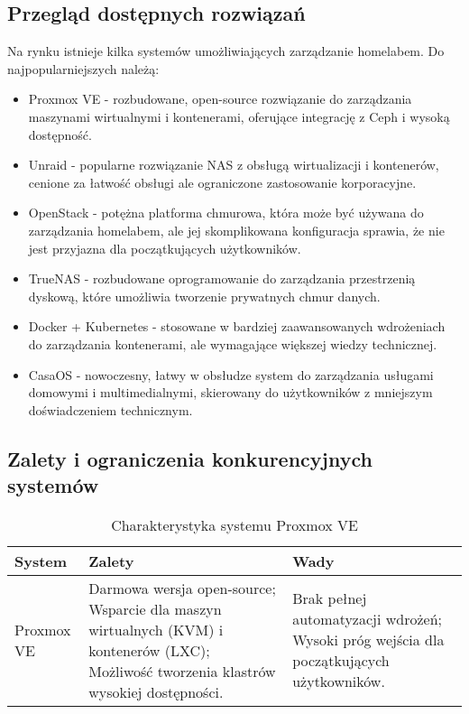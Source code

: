 \subsection{Przegląd dostępnych rozwiązań}
Na rynku istnieje kilka systemów umożliwiających zarządzanie homelabem. Do najpopularniejszych należą:
\begin{itemize}
    \item Proxmox VE \cite{Proxmox} - rozbudowane, open-source rozwiązanie do zarządzania maszynami wirtualnymi i kontenerami, oferujące integrację z Ceph i wysoką dostępność.
    \item Unraid \cite{Unraid} - popularne rozwiązanie NAS z obsługą wirtualizacji i kontenerów, cenione za łatwość obsługi ale ograniczone zastosowanie korporacyjne.
    \item OpenStack \cite{OpenStack} - potężna platforma chmurowa, która może być używana do zarządzania homelabem, ale jej skomplikowana konfiguracja sprawia, że nie jest przyjazna dla początkujących użytkowników.
    \item TrueNAS \cite{TrueNAS} - rozbudowane oprogramowanie do zarządzania przestrzenią dyskową, które umożliwia tworzenie prywatnych chmur danych.
    \item Docker \cite{Docker} + Kubernetes \cite{Kubernetes} - stosowane w bardziej zaawansowanych wdrożeniach do zarządzania kontenerami, ale wymagające większej wiedzy technicznej.
    \item CasaOS \cite{CasaOS} - nowoczesny, łatwy w obsłudze system do zarządzania usługami domowymi i multimedialnymi, skierowany do użytkowników z mniejszym doświadczeniem technicznym.
\end{itemize}


\subsection{Zalety i ograniczenia konkurencyjnych systemów}

\begin{table}[H]
\centering
\begin{tabular}{|p{3cm}|p{6cm}|p{6cm}|}
\hline
\textbf{System} & \textbf{Zalety} & \textbf{Wady} \\
\hline
Proxmox VE &
Darmowa wersja open-source; Wsparcie dla maszyn wirtualnych (KVM) i kontenerów (LXC); Możliwość tworzenia klastrów wysokiej dostępności. &
Brak pełnej automatyzacji wdrożeń; Wysoki próg wejścia dla początkujących użytkowników. \\
\hline
\end{tabular}
\caption{Charakterystyka systemu Proxmox VE}
\end{table}

